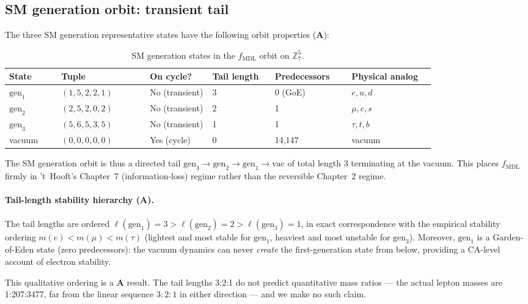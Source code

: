 \documentclass[11pt]{article}
\theoremstyle{remark}
\newcommand{\MDL}{\text{MDL}}
\newcommand{\CatA}{\textbf{A}}
\begin{document}
\subsection{SM generation orbit: transient tail}
\label{ssec:sm_orbit}

The three SM generation representative states have the following
orbit properties (\CatA{}):

\begin{table}[h!]
\centering
\caption{SM generation states in the $f_{\MDL}$ orbit on
$\mathbb{Z}_7^5$.}
\label{tab:sm_orbit}
\begin{tabular}{P{0.10\linewidth}P{0.17\linewidth}P{0.12\linewidth}P{0.12\linewidth}P{0.14\linewidth}P{0.16\linewidth}}
\toprule
State & Tuple & On cycle? & Tail length & Predecessors & Physical analog\\
\midrule
$\text{gen}_1$ & $(1,5,2,2,1)$ & No (transient) & 3 & 0 (GoE) & $e,u,d$\\
$\text{gen}_2$ & $(2,5,2,0,2)$ & No (transient) & 2 & 1 & $\mu,c,s$\\
$\text{gen}_3$ & $(5,6,5,3,5)$ & No (transient) & 1 & 1 & $\tau,t,b$\\
vacuum         & $(0,0,0,0,0)$ & Yes (cycle)     & 0 & 14{,}147 & vacuum\\
\bottomrule
\end{tabular}
\end{table}

The SM generation orbit is thus a directed tail
$\text{gen}_3 \to \text{gen}_2 \to \text{gen}_1 \to \text{vac}$
of total length 3 terminating at the vacuum.
This places $f_{\MDL}$ firmly in 't~Hooft's Chapter~7
(information-loss) regime rather than the reversible Chapter~2 regime.

\paragraph{Tail-length stability hierarchy (\CatA{}).}
The tail lengths are ordered $\ell(\text{gen}_1) = 3 >
\ell(\text{gen}_2) = 2 > \ell(\text{gen}_3) = 1$, in exact
correspondence with the empirical stability ordering
$m(e) < m(\mu) < m(\tau)$ (lightest and most stable for $\text{gen}_1$,
heaviest and most unstable for $\text{gen}_3$).
Moreover, $\text{gen}_1$ is a Garden-of-Eden state (zero predecessors):
the vacuum dynamics can never \emph{create} the first-generation state
from below, providing a CA-level account of electron stability.

This qualitative ordering is a \CatA{} result.
The tail lengths 3:2:1 do not predict quantitative mass ratios ---
the actual lepton masses are 1:207:3477, far from the linear sequence
$3:2:1$ in either direction --- and we make no such claim.
\end{document}
